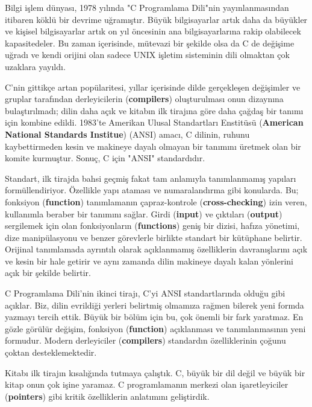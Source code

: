 \documentclass[a4paper,12pt,oneside]{book}
\begin{document}
Bilgi işlem dünyası, 1978 yılında "C Programlama Dili"nin yayınlanmasından itibaren köklü bir devrime uğramıştır. Büyük bilgisayarlar artık daha da büyükler ve kişisel bilgisayarlar artık on yıl öncesinin ana bilgisayarlarına rakip olabilecek kapasitedeler. Bu zaman içerisinde, mütevazi bir şekilde olsa da C de değişime uğradı ve kendi orijini olan sadece UNIX işletim sisteminin dili olmaktan çok uzaklara yayıldı.
\par C'nin gittikçe artan popülaritesi, yıllar içerisinde dilde gerçekleşen değişimler ve gruplar tarafından derleyicilerin (\textbf{compilers}) oluşturulması onun dizaynına bulaştırılmadı; dilin daha açık ve kitabın ilk tirajına göre daha çağdaş bir tanımı için kombine edildi. 1983'te Amerikan Ulusal Standartları Enstitüsü (\textbf{American National Standards Institue}) (ANSI) amacı, C dilinin, ruhunu kaybettirmeden kesin ve makineye dayalı olmayan bir tanımını üretmek olan bir komite kurmuştur. Sonuç, C için "ANSI" standardıdır.
\par Standart, ilk tirajda bahsi geçmiş fakat tam anlamıyla tanımlanmamış yapıları formüllendiriyor. Özellikle yapı ataması ve numaralandırma gibi konularda. Bu; fonksiyon (\textbf{function}) tanımlamanın çapraz-kontrole (\textbf{cross-checking}) izin veren, kullanımla beraber bir tanımını sağlar. Girdi (\textbf{input}) ve çıktıları (\textbf{output}) sergilemek için olan fonksiyonların (\textbf{functions}) geniş bir dizisi, hafıza yönetimi, dize manipülasyonu ve benzer görevlerle birlikte standart bir kütüphane belirtir. Orijinal tanımlamada ayrıntılı olarak açıklanmamış özelliklerin davranışlarını açık ve kesin bir hale getirir ve aynı zamanda dilin makineye dayalı kalan yönlerini açık bir şekilde belirtir.
\par C Programlama Dili'nin ikinci tirajı, C'yi ANSI standartlarında olduğu gibi açıklar. Biz, dilin evrildiği yerleri belirtmiş olmamıza rağmen bilerek yeni formda yazmayı tercih ettik. Büyük bir bölüm için bu, çok önemli bir fark yaratmaz. En gözle görülür değişim, fonksiyon (\textbf{function}) açıklanması ve tanımlanmasının yeni formudur. Modern derleyiciler (\textbf{compilers}) standardın özelliklerinin çoğunu çoktan desteklemektedir.
\par Kitabı ilk tirajın kısalığında tutmaya çalıştık. C, büyük bir dil değil ve büyük bir kitap onun çok işine yaramaz. C programlamanın merkezi olan işaretleyiciler (\textbf{pointers}) gibi kritik özelliklerin anlatımını geliştirdik. \pagebreak
\end{document}
